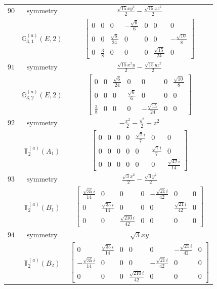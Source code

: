 \documentclass[fleqn,8pt,landscape]{jsarticle}
\begin{document}
\begin{longtable}{ccc}
$ 90 $ & $ \text{symmetry} $ & $ \frac{\sqrt{15} x y^{2}}{2} - \frac{\sqrt{15} x z^{2}}{2} $ \\
$  $ & $ \mathbb{G}_{3,1}^{(a)}(E,2) $ & $ \begin{bmatrix} 0 & 0 & 0 & - \frac{\sqrt{6}}{6} & 0 & 0 & 0 \\ 0 & 0 & \frac{\sqrt{6}}{24} & 0 & 0 & 0 & - \frac{\sqrt{10}}{8} \\ 0 & \frac{3}{8} & 0 & 0 & 0 & \frac{\sqrt{15}}{24} & 0 \end{bmatrix} $ \\ \hline
$ 91 $ & $ \text{symmetry} $ & $ \frac{\sqrt{15} x^{2} y}{2} - \frac{\sqrt{15} y z^{2}}{2} $ \\
$  $ & $ \mathbb{G}_{3,2}^{(a)}(E,2) $ & $ \begin{bmatrix} 0 & 0 & \frac{\sqrt{6}}{24} & 0 & 0 & 0 & \frac{\sqrt{10}}{8} \\ 0 & 0 & 0 & \frac{\sqrt{6}}{6} & 0 & 0 & 0 \\ \frac{3}{8} & 0 & 0 & 0 & - \frac{\sqrt{15}}{24} & 0 & 0 \end{bmatrix} $ \\ \hline
$ 92 $ & $ \text{symmetry} $ & $ - \frac{x^{2}}{2} - \frac{y^{2}}{2} + z^{2} $ \\
$  $ & $ \mathbb{T}_{2}^{(a)}(A_{1}) $ & $ \begin{bmatrix} 0 & 0 & 0 & 0 & \frac{\sqrt{7} i}{7} & 0 & 0 \\ 0 & 0 & 0 & 0 & 0 & \frac{\sqrt{7} i}{7} & 0 \\ 0 & 0 & 0 & 0 & 0 & 0 & \frac{\sqrt{42} i}{14} \end{bmatrix} $ \\ \hline
$ 93 $ & $ \text{symmetry} $ & $ \frac{\sqrt{3} x^{2}}{2} - \frac{\sqrt{3} y^{2}}{2} $ \\
$  $ & $ \mathbb{T}_{2}^{(a)}(B_{1}) $ & $ \begin{bmatrix} \frac{\sqrt{35} i}{14} & 0 & 0 & 0 & - \frac{\sqrt{21} i}{42} & 0 & 0 \\ 0 & \frac{\sqrt{35} i}{14} & 0 & 0 & 0 & \frac{\sqrt{21} i}{42} & 0 \\ 0 & 0 & \frac{\sqrt{210} i}{42} & 0 & 0 & 0 & 0 \end{bmatrix} $ \\ \hline
$ 94 $ & $ \text{symmetry} $ & $ \sqrt{3} x y $ \\
$  $ & $ \mathbb{T}_{2}^{(a)}(B_{2}) $ & $ \begin{bmatrix} 0 & \frac{\sqrt{35} i}{14} & 0 & 0 & 0 & - \frac{\sqrt{21} i}{42} & 0 \\ - \frac{\sqrt{35} i}{14} & 0 & 0 & 0 & - \frac{\sqrt{21} i}{42} & 0 & 0 \\ 0 & 0 & 0 & \frac{\sqrt{210} i}{42} & 0 & 0 & 0 \end{bmatrix} $ \\ \hline

\end{longtable}
\end{document}
